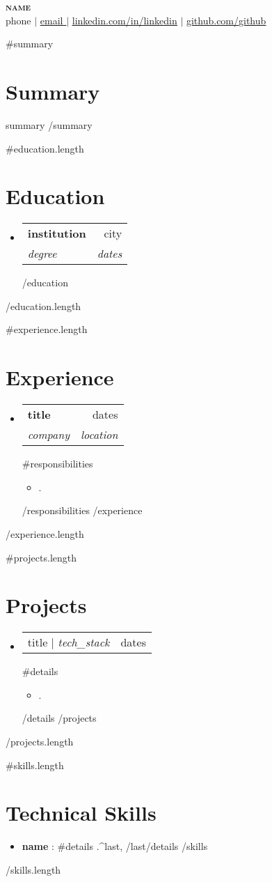 \documentclass[letterpaper,11pt]{article}
\newcommand{\resumeItem}[1]{
  \item\small{
    {#1 \vspace{-2pt}}
  }
}
\newcommand{\resumeSubheading}[4]{
  \vspace{-2pt}\item
    \begin{tabularx}{\textwidth}{Xr}
      \textbf{#1} & #2 \\
      \textit{\small#3} & \textit{\small #4} \\
    \end{tabularx}\vspace{-7pt}
}
\newcommand{\resumeProjectHeading}[2]{
    \item
    \begin{tabularx}{\textwidth}{Xr}
      \small#1 & #2 \\
    \end{tabularx}\vspace{-7pt}
}
\newcommand{\resumeSubHeadingListStart}{\begin{itemize}[leftmargin=0.15in, label={}]}
\newcommand{\resumeSubHeadingListEnd}{\end{itemize}}
\newcommand{\resumeItemListStart}{\begin{itemize}}
\newcommand{\resumeItemListEnd}{\end{itemize}\vspace{-12pt}}
\begin{document}
\begin{center}
    \textbf{\Huge \scshape {{name}}} \\ \vspace{1pt}
    \small {{phone}} $|$ \href{mailto:{{email}}}{\underline{ {{email}} }} $|$ 
    \href{https://linkedin.com/in/{{linkedin}}}{\underline{linkedin.com/in/{{linkedin}}}} $|$
    \href{https://github.com/{{github}}}{\underline{github.com/{{github}}}}
\end{center}

{{#summary}}
\section{Summary}
{{summary}}
{{/summary}}

{{#education.length}}
\section{Education}
  \resumeSubHeadingListStart
  {{#education}}
    \resumeSubheading
      { {{institution}} }{ {{city}} }
      { {{degree}} }{ {{dates}} }
  {{/education}}
  \resumeSubHeadingListEnd
{{/education.length}}

{{#experience.length}}
\section{Experience}
  \resumeSubHeadingListStart
  {{#experience}}
    \resumeSubheading
      { {{title}} }{ {{dates}} }
      { {{company}} }{ {{location}} }
      {{#responsibilities}}
      \resumeItemListStart
        \resumeItem{ {{.}} }
      \resumeItemListEnd
      {{/responsibilities}}
  {{/experience}}
  \resumeSubHeadingListEnd
{{/experience.length}}

{{#projects.length}}
\section{Projects}
  \resumeSubHeadingListStart
  {{#projects}}
    \resumeProjectHeading
      { {{title}} $|$ \emph{ {{tech_stack}} } }{ {{dates}} }
      {{#details}}
      \resumeItemListStart
        \resumeItem{ {{.}} }
      \resumeItemListEnd
      {{/details}}
  {{/projects}}
  \resumeSubHeadingListEnd
{{/projects.length}}

{{#skills.length}}
\section{Technical Skills}
  \resumeSubHeadingListStart
  {{#skills}}
    \item \textbf{ {{name}} } : {{#details}} {{.}}{{^last}}, {{/last}}{{/details}}
  {{/skills}}
  \resumeSubHeadingListEnd
{{/skills.length}}
\end{document}
